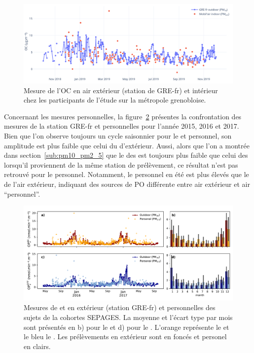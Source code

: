 \begin{figure}[ht]
    \centering
    \includegraphics[width=1.\linewidth]{figures/chapter05/OC_mobilair.png}
    \caption{Mesure de l'OC en air extérieur (station de GRE-fr) et intérieur chez les
    participants de l'étude sur la métropole grenobloise.}%
    \label{fig:figures/chapter05/OC_mobilair}
\end{figure}

Concernant les mesures personnelles, la figure~\ref{fig:figures/chapter05/personnal_OP}
présentes la confrontation des mesures de la station GRE-fr et personnelles pour l'année
2015, 2016 et 2017. Bien que l'on observe toujours un cycle saisonnier pour le \POAAv{} et
\PODTTv{} personnel, son amplitude est plus faible que celui du \POv{} d'extérieur. Aussi,
alors que l'on a montrée dans section~\ref{sub:pm10_pm2_5} que le \POv{} des \PMdc{} est
toujours plus faible que celui des \PMdix{} lorsqu'il proviennent de la même station de
prélèvement, ce résultat n'est pas retrouvé pour le \POv{} personnel. Notamment, le \POv{}
personnel en été est plus élevés que le \POv{} de l'air extérieur, indiquant des sources
de PO différente entre air extérieur et air ``personnel''.

\begin{figure}[ht]
    \centering
    \includegraphics[width=1.0\linewidth]{figures/chapter05/personnal_OP.pdf}
    \caption{Mesures de \POAAv{} et \PODTTv{} en extérieur (station GRE-fr) et
    personnelles des sujets de la cohortes SEPAGES. La moyenne et l'écart type par mois
sont présentés en b) pour le \POAAv{} et d) pour le \PODTTv. L'orange représente le
\POAAv{} et le bleu le \PODTTv{}. Les prélèvements en extérieur sont en foncés et personel
en clairs.}%
    \label{fig:figures/chapter05/personnal_OP}
\end{figure}

